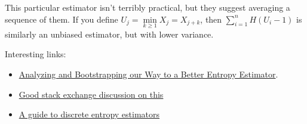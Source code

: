 This particular estimator isn't terribly practical,
but they suggest averaging a sequence of them.
If you define \(U_j = \min\limits_{k \geq 1} X_j = X_{j + k}\),
then \(\sum\limits_{i = 1}^n H(U_i - 1)\) is similarly an unbiased estimator,
but with lower variance.

Interesting links:

\begin{itemize}
\item \href{http://thirdorderscientist.org/homoclinic-orbit/2013/7/23/analyzing-and-bootstrapping-our-way-to-a-better-entropy-estimator-mdash-part-ii-computational}{Analyzing and Bootstrapping our Way to a Better Entropy Estimator}.
\item \href{https://math.stackexchange.com/questions/604654/estimating-the-entropy}{Good stack exchange discussion on this}
\item \href{https://memming.wordpress.com/2014/02/09/a-guide-to-discrete-entropy-estimators/}{A guide to discrete entropy estimators}
\end{itemize}
